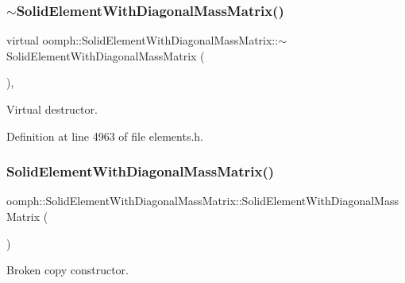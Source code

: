 \subsubsection{\texorpdfstring{$\sim$\+Solid\+Element\+With\+Diagonal\+Mass\+Matrix()}{~SolidElementWithDiagonalMassMatrix()}}
{\footnotesize\ttfamily virtual oomph\+::\+Solid\+Element\+With\+Diagonal\+Mass\+Matrix\+::$\sim$\+Solid\+Element\+With\+Diagonal\+Mass\+Matrix (\begin{DoxyParamCaption}{ }\end{DoxyParamCaption})\hspace{0.3cm}{\ttfamily [inline]}, {\ttfamily [virtual]}}



Virtual destructor. 



Definition at line 4963 of file elements.\+h.

\mbox{\label{classoomph_1_1SolidElementWithDiagonalMassMatrix_af26b74b9e29bc074bf2845556ff1bbae}} 
\subsubsection{\texorpdfstring{Solid\+Element\+With\+Diagonal\+Mass\+Matrix()}{SolidElementWithDiagonalMassMatrix()}\hspace{0.1cm}{\footnotesize\ttfamily [2/2]}}
{\footnotesize\ttfamily oomph\+::\+Solid\+Element\+With\+Diagonal\+Mass\+Matrix\+::\+Solid\+Element\+With\+Diagonal\+Mass\+Matrix (\begin{DoxyParamCaption}\item[{const \hyperlink{classoomph_1_1SolidElementWithDiagonalMassMatrix}{Solid\+Element\+With\+Diagonal\+Mass\+Matrix} \&}]{ }\end{DoxyParamCaption})\hspace{0.3cm}{\ttfamily [inline]}}



Broken copy constructor. 



